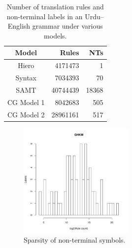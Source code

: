 \documentclass{article}
\begin{document}
\begin{table}
\centering
\begin{tabular}{|c|r|r|}
\hline
Model & Rules & NTs\\
\hline
Hiero & 4171473 & 1\\
Syntax & 7034393 & 70\\
SAMT & 40744439 & 18368\\
CG Model 1 & 8042683 & 505\\
CG Model 2 & 28961161 & 517\\
\hline
\end{tabular}
\caption{Number of translation rules and non-terminal labels in an Urdu--English grammar under various models.\label{table:rule-count}}
\end{table}


\begin{figure}[t]
\includegraphics[width=0.5\textwidth]{figures/ghkm}
\caption{Sparsity of non-terminal symbols.\label{fig:hist1}}
\end{figure}
\end{document}
